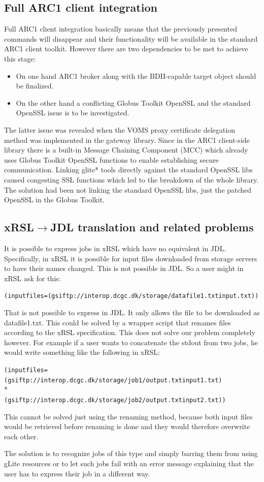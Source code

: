 \documentclass{article}
\begin{document}
\subsection{Full ARC1 client integration}
Full ARC1 client integration basically means that the previously presented commands will disappear and their functionality will be available in the standard ARC1 client toolkit. However there are two dependencies to be met to achieve this stage:
\begin{itemize}
\item On one hand ARC1 broker along with the BDII-capable target object should be finalized.
\item On the other hand a conflicting Globus Toolkit OpenSSL and the standard OpenSSL issue is to be investigated.
\end{itemize}
The latter issue was revealed when the VOMS proxy certificate delegation method was implemented in the gateway library. Since in the ARC1 client-side library there is a built-in Message Chaining Component (MCC) which already uses Globus Toolkit OpenSSL functions to enable establishing secure communication. Linking glite* tools directly against the standard OpenSSL libs caused congesting SSL functions which led to the breakdown of the whole library. The solution had been not linking the standard OpenSSL libs, just the patched OpenSSL in the Globus Toolkit.
\subsection{xRSL${\rightarrow}$JDL translation and related problems}
It is possible to express jobs in xRSL which have no equivalent in JDL. Speciﬁcally, in xRSL it is possible for input files downloaded from storage servers to have their names changed. This is not possible in JDL. So a user might in xRSL ask for this:
\begin{shaded}
\verb#(inputfiles=(gsiftp://interop.dcgc.dk/storage/datafile1.txtinput.txt))#
\end{shaded}
That is not possible to express in JDL. It only allows the file to be downloaded as datafile1.txt. This could be solved by a wrapper script that renames files according to the xRSL speciﬁcation. This does not solve our problem completely however. For example if a user wants to concatenate the stdout from two jobs, he would write something like the following in xRSL:
\begin{shaded}
\verb#(inputfiles=(gsiftp://interop.dcgc.dk/storage/job1/output.txtinput1.txt)#\\*
\verb#            (gsiftp://interop.dcgc.dk/storage/job2/output.txtinput2.txt))#
\end{shaded}
This cannot be solved just using the renaming method, because both input files would be retrieved before renaming is done and they would therefore overwrite each other.\par
The solution is to recognize jobs of this type and simply barring them from using gLite resources or to let such jobs fail with an error message explaining that the user has to express their job in a different way.
\end{document}

